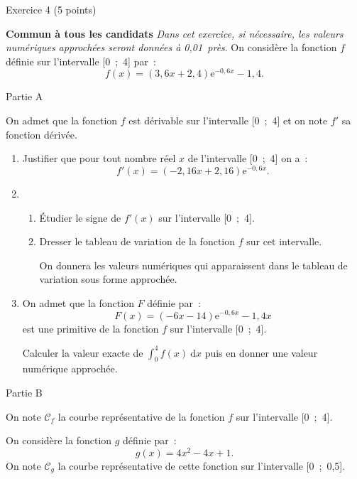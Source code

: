 
\begin{h2}Exercice 4 (5 points)\end{h2}
\textbf{Commun à tous les candidats}
\medskip
\emph{Dans cet exercice, si nécessaire, les valeurs numériques approchées seront données à 0,01~près}.
\medskip
On considère la fonction $f$ définie sur l'intervalle [0~;~4] par~:
\[f(x) = (3,6x + 2,4)\text{e}^{-0,6x}- 1,4.\]
\begin{center}\begin{h3}Partie A \end{h3}\end{center}
On admet que la fonction $f$ est dérivable sur l'intervalle [0~;~4] et on note $f'$ sa fonction dérivée.
\medskip
\begin{enumerate}
     \item Justifier que pour tout nombre réel $x$ de l'intervalle [0~;~4] on a~:
     \[f'(x) = (- 2,16 x + 2,16)\text{e}^{-0,6x}.\]
     \item
     \begin{enumerate}[label=\alph*.]
          \item Étudier le signe de $f'(x)$ sur l'intervalle [0~;~4].
          \item Dresser le tableau de variation de la fonction $f$ sur cet intervalle.
          \par
          On donnera les valeurs numériques qui apparaissent dans le tableau de variation sous
          forme approchée.
     \end{enumerate}
     \item  On admet que la fonction $F$ définie par~:
     \[F(x) = (- 6x - 14)\text{e}^{-0,6x} - 1,4x\]
     est une primitive de la fonction $f$ sur l'intervalle [0~;~4].
     \par
     Calculer la valeur exacte de $\displaystyle\int_0^4  f(x)\:\text{d}x$ puis en donner une valeur numérique approchée.
\end{enumerate}
\begin{center}\begin{h3}Partie B \end{h3}\end{center}
On note $\mathscr{C}_f$ la courbe représentative de la fonction $f$ sur l'intervalle [0~;~4].
\par
On considère la fonction $g$ définie par~:
\[g(x) = 4x^2 - 4x + 1.\]
On note $\mathscr{C}_g$ la courbe représentative de cette fonction sur l'intervalle [0~;~0,5].
